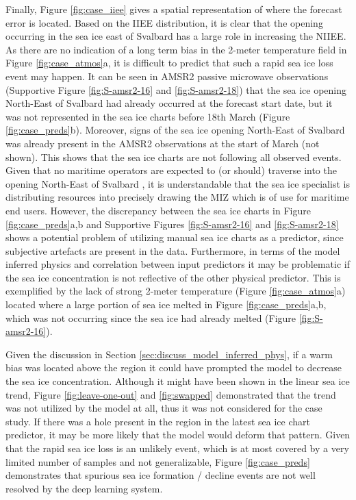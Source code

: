 \documentclass[../main/thesis]{subfiles}
\begin{document}
Finally, Figure \ref{fig:case_iiee} gives a spatial representation of where the forecast error is located. Based on the IIEE distribution, it is clear that the opening occurring in the sea ice east of Svalbard has a large role in increasing the NIIEE. As there are no indication of a long term bias in the 2-meter temperature field in Figure \ref{fig:case_atmos}a, it is difficult to predict that such a rapid sea ice loss event may happen. It can be seen in AMSR2 passive microwave observations (Supportive Figure \ref{fig:S-amsr2-16} and \ref{fig:S-amsr2-18}) that the sea ice opening North-East of Svalbard had already occurred at the forecast start date, but it was not represented in the sea ice charts before 18th March (Figure \ref{fig:case_preds}b). Moreover, signs of the sea ice opening North-East of Svalbard was already present in the AMSR2 observations at the start of March (not shown). This shows that the sea ice charts are not following all observed events. Given that no maritime operators are expected to (or should) traverse into the opening North-East of Svalbard \citep{Stocker2020}, it is understandable that the sea ice specialist is distributing resources into precisely drawing the MIZ which is of use for maritime end users. However, the discrepancy between the sea ice charts in Figure \ref{fig:case_preds}a,b and Supportive Figures \ref{fig:S-amsr2-16} and {\ref{fig:S-amsr2-18}} shows a potential problem of utilizing manual sea ice charts as a predictor, since subjective artefacts are present in the data. Furthermore, in terms of the model inferred physics and correlation between input predictors it may be problematic if the sea ice concentration is not reflective of the other physical predictor. This is exemplified by the lack of strong 2-meter temperature (Figure \ref{fig:case_atmos}a) located where a large portion of sea ice melted in Figure \ref{fig:case_preds}a,b, which was not occurring since the sea ice had already melted (Figure \ref{fig:S-amsr2-16}).

Given the discussion in Section \ref{sec:discuss_model_inferred_phys}, if a warm bias was located above the region it could have prompted the model to decrease the sea ice concentration. Although it might have been shown in the linear sea ice trend, Figure \ref{fig:leave-one-out} and \ref{fig:swapped} demonstrated that the trend was not utilized by the model at all, thus it was not considered for the case study. If there was a hole present in the region in the latest sea ice chart predictor, it may be more likely that the model would deform that pattern. Given that the rapid sea ice loss is an unlikely event, which is at most covered by a very limited number of samples and not generalizable, Figure \ref{fig:case_preds} demonstrates that spurious sea ice formation / decline events are not well resolved by the deep learning system.

\biblio
\end{document}
